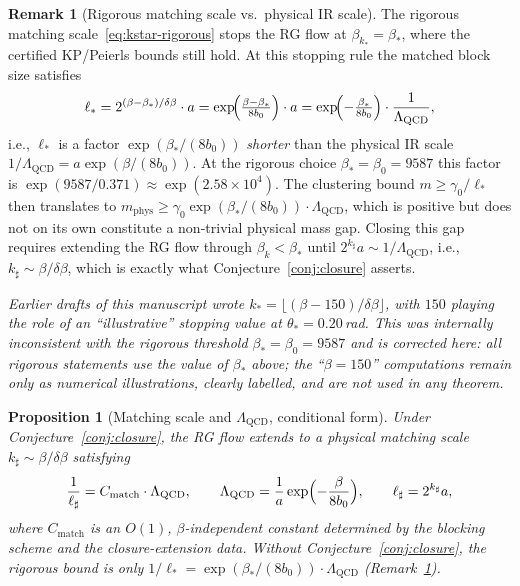 \documentclass[11pt]{article}
\newtheorem{proposition}[theorem]{Proposition}
\theoremstyle{definition}
\newtheorem{remark}[theorem]{Remark}
\newcommand{\Lam}{\Lambda_{\mathrm{QCD}}}
\begin{document}
\begin{remark}[Rigorous matching scale vs.\ physical IR scale]
\label{rem:matching-honest}
The rigorous matching scale~\eqref{eq:kstar-rigorous} stops the RG
flow at $\beta_{k_*}=\beta_*$, where the certified KP/Peierls bounds
still hold.  At this stopping rule the matched block size satisfies
\[
\ell_*=2^{(\beta-\beta_*)/\delta\beta}\cdot a
=\exp\!\Bigl(\tfrac{\beta-\beta_*}{8b_0}\Bigr)\cdot a
=\exp\!\Bigl(-\tfrac{\beta_*}{8b_0}\Bigr)\cdot\frac{1}{\Lam},
\]
i.e., $\ell_*$ is a factor $\exp(\beta_*/(8b_0))$ \emph{shorter} than
the physical IR scale $1/\Lam=a\exp(\beta/(8b_0))$.  At the rigorous
choice $\beta_*=\beta_0=9587$ this factor is
$\exp(9587/0.371)\approx\exp(2.58\times 10^4)$.  The clustering bound
$m\ge\gamma_0/\ell_*$ then translates to
$m_{\mathrm{phys}}\ge\gamma_0\exp(\beta_*/(8b_0))\cdot\Lam$, which is
positive but does not on its own constitute a non-trivial physical
mass gap.  Closing this gap requires extending the RG flow through
$\beta_k<\beta_*$ until $2^{k_\sharp}a\sim 1/\Lam$, i.e.,
$k_\sharp\sim\beta/\delta\beta$, which is exactly what
Conjecture~\ref{conj:closure} asserts.

\emph{Earlier drafts of this manuscript wrote
$k_*=\lfloor(\beta-150)/\delta\beta\rfloor$, with $150$ playing the
role of an ``illustrative'' stopping value at $\theta_*=0.20$\,rad.
This was internally inconsistent with the rigorous threshold
$\beta_*=\beta_0=9587$ and is corrected here: all rigorous statements
use the value of $\beta_*$ above; the ``$\beta=150$'' computations
remain only as numerical illustrations, clearly labelled, and are
not used in any theorem.}
\end{remark}

\begin{proposition}[Matching scale and $\Lam$, conditional form]\label{prop:matching}
Under Conjecture~\ref{conj:closure}, the RG flow extends to a
physical matching scale $k_\sharp\sim\beta/\delta\beta$ satisfying
\begin{equation}\label{eq:matching}
\frac{1}{\ell_\sharp}=C_{\mathrm{match}}\cdot\Lam,
\qquad\Lam=\frac{1}{a}\exp\Bigl(-\frac{\beta}{8b_0}\Bigr),
\qquad\ell_\sharp=2^{k_\sharp}a,
\end{equation}
where $C_{\mathrm{match}}$ is an $O(1)$, $\beta$-independent constant
determined by the blocking scheme and the closure-extension data.
Without Conjecture~\ref{conj:closure}, the rigorous bound is only
$1/\ell_*=\exp(\beta_*/(8b_0))\cdot\Lam$
(Remark~\ref{rem:matching-honest}).
\end{proposition}
\end{document}
